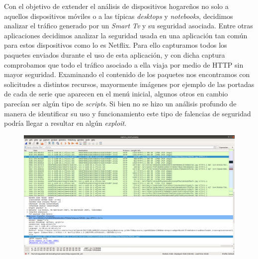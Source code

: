 \documentclass[10pt,a4paper]{article}
\begin{document}
Con el objetivo de extender el análisis de dispositivos hogareños no solo a aquellos dispositivos móviles o a las típicas \textit{desktops} y \textit{notebooks}, decidimos analizar el tráfico generado por un \textit{Smart Tv} y su seguridad asociada. Entre otras aplicaciones decidimos analizar la seguridad usada en una aplicación tan común para estos dispositivos como lo es Netflix.
Para ello capturamos todos los paquetes enviados durante el uso de esta aplicación, y con dicha captura comprobamos que todo el tráfico asociado a ella viaja por medio de HTTP sin mayor seguridad. Examinando el contenido de los paquetes nos encontramos con solicitudes a distintos recursos, mayormente imágenes por ejemplo de las portadas de cada de serie que aparecen en el menú inicial, algunos otros en cambio parecían ser algún tipo de \textit{scripts}. Si bien no se hizo un análisis profundo de manera de identificar su uso y funcionamiento este tipo de falencias de seguridad podría llegar a resultar en algún \textit{exploit}. 




    
\begin{figure}[H]
\centerline{\includegraphics[scale=0.33]{images/captura_smart_tv.png}}
\caption{}
\end{figure}
\end{document}
